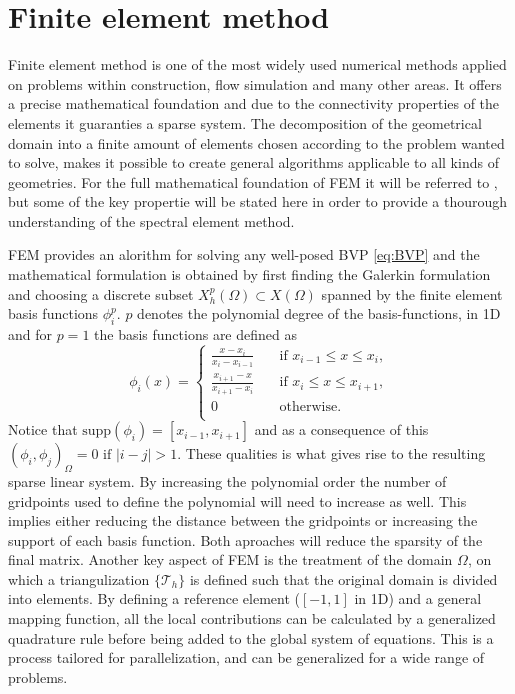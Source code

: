 \section{Finite element method}

Finite element method is one of the most widely used numerical methods applied on problems within construction, flow simulation and many 
other areas. It offers a precise mathematical foundation and due to the connectivity properties of the elements 
it guaranties a sparse system. The decomposition of the geometrical domain into a finite amount of elements chosen according to the problem 
wanted to solve, makes it possible to create general algorithms applicable to all kinds of geometries. 
For the full mathematical foundation of FEM it will be referred to \cite{Quarteroni}, but some of the key propertie will be stated here
in order to provide a thourough understanding of the spectral element method. 

FEM provides an alorithm for solving any well-posed BVP \ref{eq:BVP} and the mathematical formulation is obtained by first finding the Galerkin
formulation and choosing a discrete subset $X^p_h(\Omega) \subset X(\Omega)$ spanned by the finite element basis functions ${\phi^p_i}$.
$p$ denotes the polynomial degree of the basis-functions, in 1D and for $p=1$ the basis functions are defined as
\[ \phi_i(x) =
    \begin{cases}
        \frac{x-x_i}{x_i-x_{i-1}}  & \quad \text{if } x_{i-1}\leq x \leq x_i, \\
        \frac{x_{i+1}-x}{x_{i+1}-x_i}  & \quad \text{if } x_{i}\leq x \leq x_{i+1}, \\
        0  & \quad \text{otherwise}. \\
    \end{cases}
\]
Notice that $\text{supp}(\phi_i) = [x_{i-1},x_{i+1}]$ and as a consequence of this $(\phi_i,\phi_j)_{\Omega} = 0 \text{ if } |i-j| > 1 $. 
These qualities is what gives rise to the resulting sparse linear system. 
By increasing the polynomial order the number of gridpoints used to define the polynomial will need to increase as well.
This implies either reducing the distance between the gridpoints or increasing the support of each basis function.
Both aproaches will reduce the sparsity of the final matrix.
Another key aspect of FEM is the treatment of the domain $\Omega$, 
on which a triangulization $\{\mathcal{T}_h\}$ is defined such that the original domain is divided into elements.
By defining a reference element ($[-1,1]$ in 1D) and a general mapping function, all the local contributions can be calculated by a 
generalized quadrature rule before being added to the global system of equations. This is a process tailored for parallelization, and can 
be generalized for a wide range of problems.

